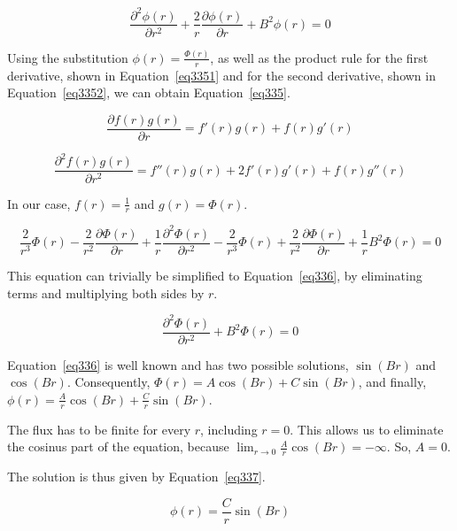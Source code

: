 \begin{equation}\label{eq334}
\frac{\partial^2 \phi(r)}{\partial r^2} + \frac{2}{r}\frac{\partial \phi(r)}{\partial r} + B^2\phi(r) = 0
\end{equation}

Using the substitution $\phi(r) = \frac{\Phi(r)}{r}$, as well as the product rule for the first derivative, shown in Equation~\ref{eq3351} and for the second derivative, shown in Equation~\ref{eq3352}, we can obtain Equation~\ref{eq335}.


\begin{equation}\label{eq3351}
\frac{\partial f(r)g(r)}{\partial r} = f'(r)g(r) + f(r)g'(r)
\end{equation}

\begin{equation}\label{eq3352}
\frac{\partial^2 f(r)g(r)}{\partial r^2} = f''(r)g(r) + 2f'(r)g'(r) + f(r)g''(r)
\end{equation}

In our case, $f(r) = \frac{1}{r}$ and $g(r) = \Phi(r)$.

\begin{equation}\label{eq335}
\frac{2}{r^3}\Phi(r) - \frac{2}{r^2}\frac{\partial \Phi(r)}{\partial r} + \frac{1}{r}\frac{\partial^2 \Phi(r)}{\partial r^2} - \frac{2}{r^3}\Phi(r) + \frac{2}{r^2}\frac{\partial \Phi(r)}{\partial r} + \frac{1}{r}B^2\Phi(r) = 0
\end{equation}

This equation can trivially be simplified to Equation~\ref{eq336}, by eliminating terms and multiplying both sides by $r$.

\begin{equation}\label{eq336}
\frac{\partial^2 \Phi(r)}{\partial r^2} + B^2\Phi(r) = 0
\end{equation}

Equation~\ref{eq336} is well known and has two possible solutions, $\sin(Br)$ and $\cos(Br)$. Consequently, $\Phi(r) = A\cos(Br) + C\sin(Br)$, and finally, $\phi(r) = \frac{A}{r}\cos(Br) + \frac{C}{r}\sin(Br)$.

The flux has to be finite for every $r$, including $r=0$. This allows us to eliminate the cosinus part of the equation, because $\lim_{r\to 0} \frac{A}{r}\cos(Br) = - \infty$. So, $A = 0$.

The solution is thus given by Equation~\ref{eq337}.

\begin{equation}\label{eq337}
\phi(r) = \frac{C}{r}\sin(Br)
\end{equation}

